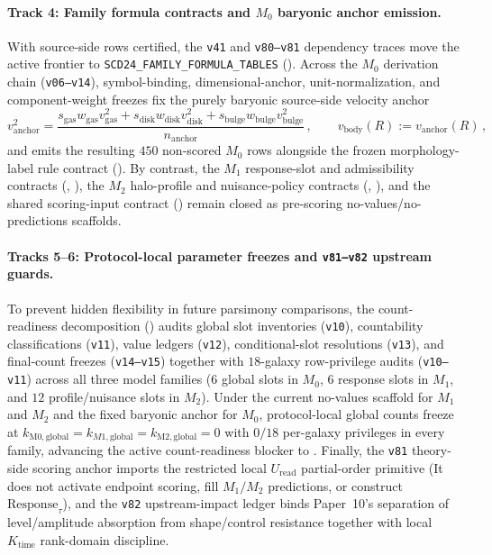 \documentclass[11pt]{article}
\begin{document}
\paragraph{Track 4: Family formula contracts and $M_0$ baryonic anchor emission.}
With source-side rows certified, the \texttt{v41} and \texttt{v80--v81}
dependency traces move the active frontier to
\texttt{SCD24\_FAMILY\_FORMULA\_TABLES} ().
Across the $M_0$ derivation chain (\texttt{v06--v14}), symbol-binding,
dimensional-anchor, unit-normalization, and component-weight freezes fix the
purely baryonic source-side velocity anchor
\begin{equation}
v_{\mathrm{anchor}}^2 =
\frac{s_{\mathrm{gas}}w_{\mathrm{gas}}v_{\mathrm{gas}}^2
+s_{\mathrm{disk}}w_{\mathrm{disk}}v_{\mathrm{disk}}^2
+s_{\mathrm{bulge}}w_{\mathrm{bulge}}v_{\mathrm{bulge}}^2}
{n_{\mathrm{anchor}}}\,,
\qquad
v_{\mathrm{body}}(R) := v_{\mathrm{anchor}}(R)\,,
\label{eq:paper11-m0-baryonic-anchor}
\end{equation}
and  emits the resulting
$450$ non-scored $M_0$ rows alongside the frozen morphology-label rule contract
(). By contrast, the $M_1$ response-slot and
admissibility contracts (,
), the $M_2$ halo-profile and nuisance-policy
contracts (,
), and the shared scoring-input contract
() remain closed as pre-scoring
no-values/no-predictions scaffolds.

\paragraph{Tracks 5--6: Protocol-local parameter freezes and \texttt{v81--v82} upstream guards.}
To prevent hidden flexibility in future parsimony comparisons, the
count-readiness decomposition ()
audits global slot inventories (\texttt{v10}), countability classifications
(\texttt{v11}), value ledgers (\texttt{v12}), conditional-slot resolutions
(\texttt{v13}), and final-count freezes (\texttt{v14--v15}) together with
$18$-galaxy row-privilege audits (\texttt{v10--v11}) across all three model
families ($6$ global slots in $M_0$, $6$ response slots in $M_1$, and $12$
profile/nuisance slots in $M_2$). Under the current no-values scaffold for
$M_1$ and $M_2$ and the fixed baryonic anchor for $M_0$, protocol-local global
counts freeze at $k_{\mathrm{M0,global}}=k_{M1,\mathrm{global}}=k_{\mathrm{M2,global}}=0$
with $0/18$ per-galaxy privileges in every family, advancing the active
count-readiness blocker to .
Finally, the \texttt{v81} theory-side scoring anchor imports the restricted
local $U_{\mathrm{read}}$ partial-order primitive (It does not activate
endpoint scoring, fill $M_1/M_2$ predictions, or construct
$\mathrm{Response}_{\tau}$), and the \texttt{v82} upstream-impact ledger binds
Paper~10's separation of level/amplitude absorption from shape/control
resistance together with local $K_{\mathrm{time}}$ rank-domain discipline.
\end{document}
